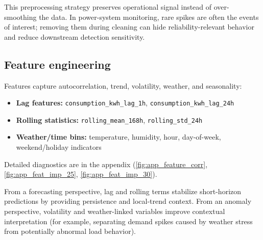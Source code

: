 This preprocessing strategy preserves operational signal instead of over-smoothing the data. In power-system monitoring, rare spikes are often the events of interest; removing them during cleaning can hide reliability-relevant behavior and reduce downstream detection sensitivity.

\subsection{Feature engineering}
Features capture autocorrelation, trend, volatility, weather, and seasonality:
\begin{itemize}
	\item \textbf{Lag features:} \texttt{consumption\_kwh\_lag\_1h}, \texttt{consumption\_kwh\_lag\_24h}
	\item \textbf{Rolling statistics:} \texttt{rolling\_mean\_168h}, \texttt{rolling\_std\_24h}
	\item \textbf{Weather/time bins:} temperature, humidity, hour, day-of-week, weekend/holiday indicators
\end{itemize}

Detailed diagnostics are in the appendix (\autoref{fig:app_feature_corr}, \autoref{fig:app_feat_imp_25}, \autoref{fig:app_feat_imp_30}).

From a forecasting perspective, lag and rolling terms stabilize short-horizon predictions by providing persistence and local-trend context. From an anomaly perspective, volatility and weather-linked variables improve contextual interpretation (for example, separating demand spikes caused by weather stress from potentially abnormal load behavior).